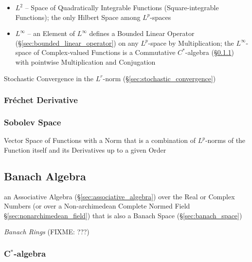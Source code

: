 \begin{itemize}
  \item $L^2$ -- Space of Quadratically Integrable Functions (Square-integrable
    Functions); the only Hilbert Space among $L^p$-spaces
  \item $L^\infty$ -- an Element of $L^\infty$ defines a Bounded Linear Operator
    (\S\ref{sec:bounded_linear_operator}) on any $L^p$-space by Multiplication;
    the $L^\infty$-space of Complex-valued Functions is a Commutative
    $C^*$-algebra (\S\ref{sec:cstar_algebra}) with pointwise Multiplication and
    Conjugation
\end{itemize}

\fist Stochastic Convergence in the $L^r$-norm
(\S\ref{sec:stochastic_convergence})



\subsubsection{Fr\'echet Derivative}\label{sec:frechet_derivative}

\subsubsection{Sobolev Space}\label{sec:sobolev_space}

Vector Space of Functions with a Norm that is a combination of $L^p$-norms of
the Function itself and its Derivatives up to a given Order



\subsection{Banach Algebra}\label{sec:banach_algebra}

an Associative Algebra (\S\ref{sec:associative_algebra}) over the Real or
Complex Numbers (or over a Non-archimedean Complete Normed Field
\S\ref{sec:nonarchimedean_field}) that is also a Banach Space
(\S\ref{sec:banach_space})

\emph{Banach Rings} (FIXME: ???)



\subsubsection{C$^*$-algebra}\label{sec:cstar_algebra}

